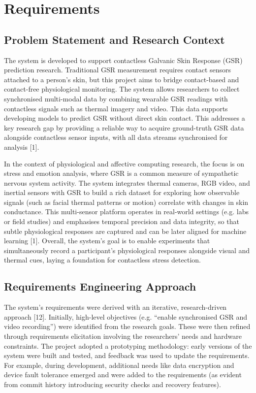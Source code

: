 
\chapter{Requirements}

\section{Problem Statement and Research Context}
The system is developed to support contactless Galvanic Skin Response (GSR) prediction research. Traditional GSR measurement requires contact sensors attached to a person's skin, but this project aims to bridge contact-based and contact-free physiological monitoring. The system allows researchers to collect synchronised multi-modal data by combining wearable GSR readings with contactless signals such as thermal imagery and video. This data supports developing models to predict GSR without direct skin contact. This addresses a key research gap by providing a reliable way to acquire ground-truth GSR data alongside contactless sensor inputs, with all data streams synchronised for analysis [1].

In the context of physiological and affective computing research, the focus is on stress and emotion analysis, where GSR is a common measure of sympathetic nervous system activity. The system integrates thermal cameras, RGB video, and inertial sensors with GSR to build a rich dataset for exploring how observable signals (such as facial thermal patterns or motion) correlate with changes in skin conductance. This multi-sensor platform operates in real-world settings (e.g. labs or field studies) and emphasises temporal precision and data integrity, so that subtle physiological responses are captured and can be later aligned for machine learning [1]. Overall, the system's goal is to enable experiments that simultaneously record a participant's physiological responses alongside visual and thermal cues, laying a foundation for contactless stress detection.

\section{Requirements Engineering Approach}
The system's requirements were derived with an iterative, research-driven approach [12]. Initially, high-level objectives (e.g. ``enable synchronised GSR and video recording'') were identified from the research goals. These were then refined through requirements elicitation involving the researchers' needs and hardware constraints. The project adopted a prototyping methodology: early versions of the system were built and tested, and feedback was used to update the requirements. For example, during development, additional needs like data encryption and device fault tolerance emerged and were added to the requirements (as evident from commit history introducing security checks and recovery features).

